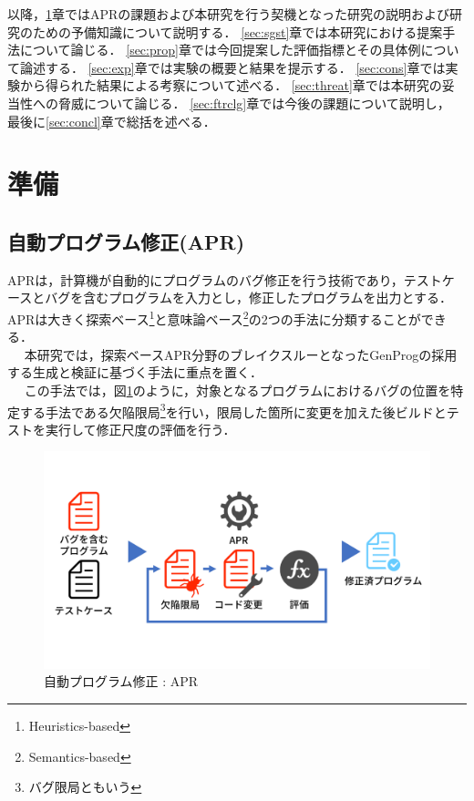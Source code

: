 \documentclass[uplatex,dvipdfmx,a4paper]{jsarticle}
\let\oldcite\cite
\renewcommand{\cite}[1]{\xspace\oldcite{#1}}
\begin{document}
以降，\ref{sec:prep}章ではAPRの課題および本研究を行う契機となった研究の説明および研究のための予備知識について説明する．
\ref{sec:sgst}章では本研究における提案手法について論じる．
\ref{sec:prop}章では今回提案した評価指標とその具体例について論述する．
\ref{sec:exp}章では実験の概要と結果を提示する．
\ref{sec:cons}章では実験から得られた結果による考察について述べる．
\ref{sec:threat}章では本研究の妥当性への脅威について論じる．
\ref{sec:ftrclg}章では今後の課題について説明し，
最後に\ref{sec:concl}章で総括を述べる．

\clearpage
\section{準備}\label{sec:prep}
\subsection{自動プログラム修正(APR)}\label{sec:apr}
APRは，計算機が自動的にプログラムのバグ修正を行う技術であり，テストケースとバグを含むプログラムを入力とし，修正したプログラムを出力とする．APRは大きく探索ベース\footnote{Heuristics-based}と意味論ベース\footnote{Semantics-based}\cite{le2018overfitting}の2つの手法に分類することができる．\\　
本研究では，探索ベースAPR分野のブレイクスルーとなったGenProg\cite{le2011genprog}の採用する生成と検証\cite{martinez2019astor}に基づく手法に重点を置く．\\　
この手法では，図\ref{fig:apr}のように，対象となるプログラムにおけるバグの位置を特定する手法である欠陥限局\footnote{バグ限局ともいう}を行い，限局した箇所に変更を加えた後ビルドとテストを実行して修正尺度の評価を行う．
\begin{figure}[t]
  \centering
  \includegraphics[width=\linewidth]{fig/apr.pdf}
  \caption{自動プログラム修正 : APR}
  \label{fig:apr}
\end{figure}
\end{document}
